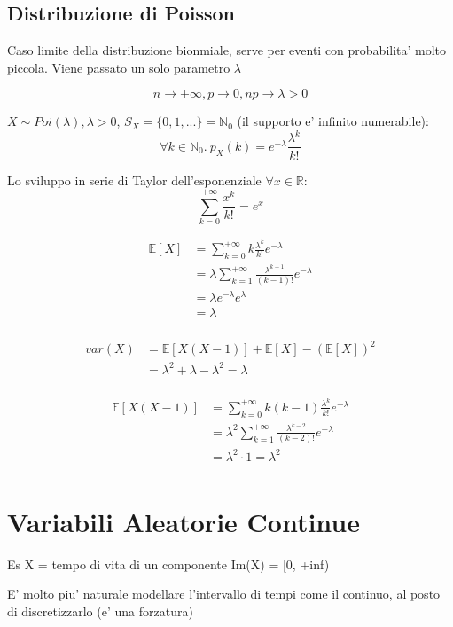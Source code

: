 \subsection{Distribuzione di Poisson}
Caso limite della distribuzione bionmiale, serve per eventi con probabilita' molto piccola. Viene passato un solo parametro $ \lambda $

\[
n\to +\infty, p\to 0, np \to \lambda > 0
\]

$ X \sim Poi(\lambda), \lambda > 0 $, $ S_X = \{0,1,...\} = \mathbb{N}_0 $ (il supporto e' infinito numerabile):
\[
  \forall k \in \mathbb{N}_0.\ p_X(k) = e^{-\lambda}\frac{\lambda^{k}}{k!}
\]

Lo sviluppo in serie di Taylor dell'esponenziale $ \forall x \in \mathbb{R} $: 
\[
\sum_{k=0}^{+\infty} \frac{x^{k}}{k!} = e^{x}
\]

\begin{align*}
  \mathbb{E}[X] &= \sum_{k=0}^{+\infty} k \frac{\lambda^{k}}{k!}e^{-\lambda} \\
  &= \lambda\sum_{k=1}^{+\infty} \frac{\lambda^{k-1}}{(k-1)!}e^{-\lambda} \\
  &= \lambda e^{-\lambda} e^{\lambda} \\
  &= \lambda \\
\end{align*}

\begin{align*}
  var(X) &= \mathbb{E}[X(X-1)] + \mathbb{E}[X] - (\mathbb{E}[X])^2\\
  &= \lambda^2 + \lambda - \lambda^2 = \lambda \\
\end{align*}

\begin{align*}
  \mathbb{E}[X(X-1)] &= \sum_{k=0}^{+\infty} k(k-1) \frac{\lambda^{k}}{k!} e^{-\lambda}\\
  &= \lambda^2 \sum_{k=1}^{+\infty} \frac{\lambda^{k-2}}{(k-2)!}e^{-\lambda} \\
  &= \lambda^2 \cdot 1 = \lambda^2 \\
\end{align*}


\section{Variabili Aleatorie Continue}

Es X = tempo di vita di un componente Im(X) = [0, +inf)

E' molto piu' naturale modellare l'intervallo di tempi come il continuo, al posto di discretizzarlo (e' una forzatura)

